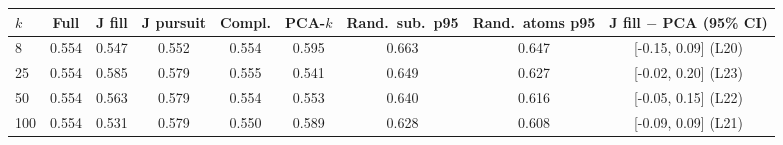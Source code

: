 \begin{tabular}{lcccccccc}\toprule
$k$ & Full & J fill & J pursuit & Compl. & PCA-$k$ & Rand.\ sub.\ p95 & Rand.\ atoms p95 & J fill $-$ PCA (95\% CI)\\\midrule
8 & 0.554 & 0.547 & 0.552 & 0.554 & 0.595 & 0.663 & 0.647 & [-0.15, 0.09] (L20)\\
25 & 0.554 & 0.585 & 0.579 & 0.555 & 0.541 & 0.649 & 0.627 & [-0.02, 0.20] (L23)\\
50 & 0.554 & 0.563 & 0.579 & 0.554 & 0.553 & 0.640 & 0.616 & [-0.05, 0.15] (L22)\\
100 & 0.554 & 0.531 & 0.579 & 0.550 & 0.589 & 0.628 & 0.608 & [-0.09, 0.09] (L21)\\
\bottomrule\end{tabular}
